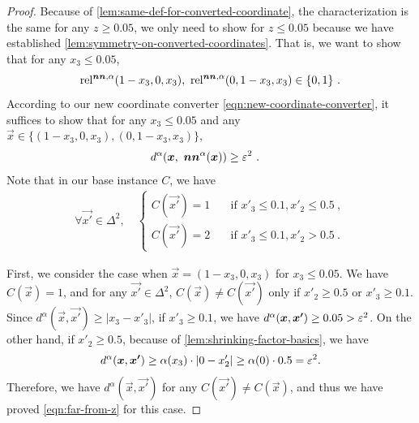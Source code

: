 \begin{proof}
    Because of \cref{lem:same-def-for-converted-coordinate}, the characterization is the same for any $z\geq 0.05$, we only need to show for $z\leq 0.05$ because we have established \cref{lem:symmetry-on-converted-coordinates}.
    That is, we want to show that for any $x_3\leq 0.05$, 
    \[
        \operatorname*{rel^{\boldsymbol{nn},\alpha}}(1-x_3, 0, x_3),~\operatorname*{rel^{\boldsymbol{nn},\alpha}}(0, 1-x_3, x_3)\in \{0,1\}~.
    \]
    According to our new coordinate converter \cref{eqn:new-coordinate-converter}, it suffices to show that for any $x_3\leq 0.05$ and any $\vec{x}\in \{(1-x_3,0,x_3), (0,1-x_3,x_3)\}$, 
    \begin{align}
        d^{\alpha}(\boldsymbol{x},\ \operatorname*{\boldsymbol{nn}^{\alpha}}(\boldsymbol{x})) &\geq \varepsilon^{2} ~.
        \label{eqn:far-from-z}
    \end{align}
    Note that in our base instance $C$, we have 
    \begin{align*}
        \forall \vec{x'}\in \Delta^2, \quad
        \begin{cases}
        C(\vec{x'}) = 1 & \quad \text{if } x'_3\leq 0.1, x'_2 \leq 0.5~,\\
        C(\vec{x'}) = 2 & \quad \text{if } x'_3\leq 0.1, x'_2 > 0.5~.
        \end{cases}
    \end{align*}
    
    First, we consider the case when $\vec{x}=(1-x_3,0,x_3)$ for $x_3\leq 0.05$.
    We have $C(\vec{x})=1$, and for any $\vec{x'}\in \Delta^2$, $C(\vec{x})\neq C(\vec{x'})$ only if $x'_2\geq 0.5$ or $x'_3\geq 0.1$.
    Since $d^{\alpha}(\vec{x},\vec{x'})\geq |x_3-x'_3|$, if $x'_3\geq 0.1$, we have $d^{\alpha}(\boldsymbol{x},\boldsymbol{x'})\geq 0.05>\varepsilon^2$.
    On the other hand, if $x'_2\geq 0.5$, because of \cref{lem:shrinking-factor-basics}, we have 
    \begin{align*}
        d^{\alpha}(\boldsymbol{x}, \boldsymbol{x'}) \geq \alpha(x_3)\cdot |0-x'_2| \geq \alpha(0) \cdot 0.5 = \varepsilon^2.
    \end{align*}
    Therefore, we have $d^{\alpha}(\vec{x}, \vec{x'})$ for any $C(\vec{x'})\neq C(\vec{x})$, and thus we have proved \cref{eqn:far-from-z} for this case.


\end{proof}
